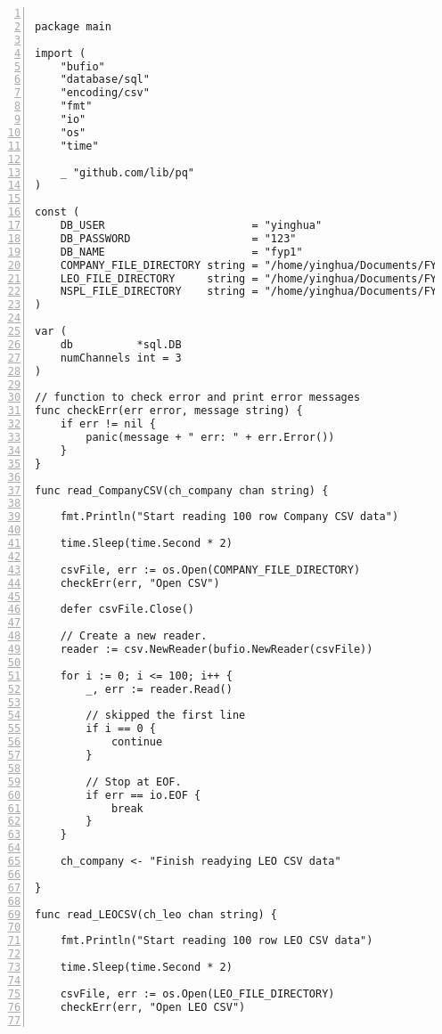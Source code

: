 \lstset{basicstyle=\ttfamily\tiny} 
\begin{lstlisting}[breaklines, frame=single, numbers=left, caption={Golang Concurrent Program Source Code}, label=commandline-02]

package main

import (
	"bufio"
	"database/sql"
	"encoding/csv"
	"fmt"
	"io"
	"os"
	"time"
	
	_ "github.com/lib/pq"
)

const (
	DB_USER                       = "yinghua"
	DB_PASSWORD                   = "123"
	DB_NAME                       = "fyp1"
	COMPANY_FILE_DIRECTORY string = "/home/yinghua/Documents/FYP-data/company-data/company-data-full.csv"
	LEO_FILE_DIRECTORY     string = "/home/yinghua/Documents/FYP-data/subject-data/institution-subject-data.csv"
	NSPL_FILE_DIRECTORY    string = "/home/yinghua/Documents/FYP-data/postcode-data/UK-NSPL.csv"
)

var (
	db          *sql.DB
	numChannels int = 3
)

// function to check error and print error messages
func checkErr(err error, message string) {
	if err != nil {
		panic(message + " err: " + err.Error())
	}
}

func read_CompanyCSV(ch_company chan string) {

	fmt.Println("Start reading 100 row Company CSV data")
	
	time.Sleep(time.Second * 2)
	
	csvFile, err := os.Open(COMPANY_FILE_DIRECTORY)
	checkErr(err, "Open CSV")
	
	defer csvFile.Close()
	
	// Create a new reader.
	reader := csv.NewReader(bufio.NewReader(csvFile))
	
	for i := 0; i <= 100; i++ {
		_, err := reader.Read()
		
		// skipped the first line
		if i == 0 {
			continue
		}
		
		// Stop at EOF.
		if err == io.EOF {
			break
		}
	}
	
	ch_company <- "Finish readying LEO CSV data"

}

func read_LEOCSV(ch_leo chan string) {

	fmt.Println("Start reading 100 row LEO CSV data")
	
	time.Sleep(time.Second * 2)
	
	csvFile, err := os.Open(LEO_FILE_DIRECTORY)
	checkErr(err, "Open LEO CSV")
	

\end{lstlisting}
